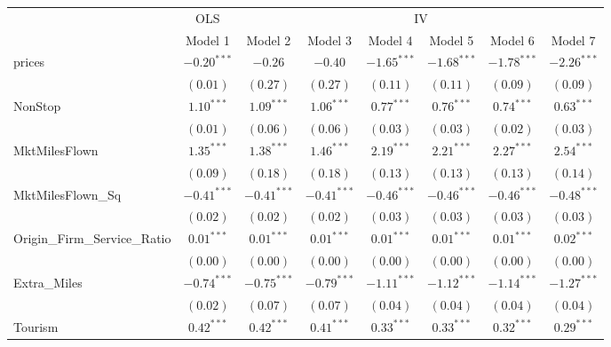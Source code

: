 
\begin{tabular}{l c c c c c c c}
\toprule
 & \multicolumn{1}{c}{OLS} & \multicolumn{6}{c}{IV} \\
\cmidrule(lr){2-2} \cmidrule(lr){3-8}
 & Model 1 & Model 2 & Model 3 & Model 4 & Model 5 & Model 6 & Model 7 \\
\midrule
prices                       & $-0.20^{***}$ & $-0.26$       & $-0.40$       & $-1.65^{***}$ & $-1.68^{***}$    & $-1.78^{***}$ & $-2.26^{***}$  \\
                             & $(0.01)$      & $(0.27)$      & $(0.27)$      & $(0.11)$      & $(0.11)$         & $(0.09)$      & $(0.09)$       \\
NonStop                      & $1.10^{***}$  & $1.09^{***}$  & $1.06^{***}$  & $0.77^{***}$  & $0.76^{***}$     & $0.74^{***}$  & $0.63^{***}$   \\
                             & $(0.01)$      & $(0.06)$      & $(0.06)$      & $(0.03)$      & $(0.03)$         & $(0.02)$      & $(0.03)$       \\
MktMilesFlown                & $1.35^{***}$  & $1.38^{***}$  & $1.46^{***}$  & $2.19^{***}$  & $2.21^{***}$     & $2.27^{***}$  & $2.54^{***}$   \\
                             & $(0.09)$      & $(0.18)$      & $(0.18)$      & $(0.13)$      & $(0.13)$         & $(0.13)$      & $(0.14)$       \\
MktMilesFlown\_Sq            & $-0.41^{***}$ & $-0.41^{***}$ & $-0.41^{***}$ & $-0.46^{***}$ & $-0.46^{***}$    & $-0.46^{***}$ & $-0.48^{***}$  \\
                             & $(0.02)$      & $(0.02)$      & $(0.02)$      & $(0.03)$      & $(0.03)$         & $(0.03)$      & $(0.03)$       \\
Origin\_Firm\_Service\_Ratio & $0.01^{***}$  & $0.01^{***}$  & $0.01^{***}$  & $0.01^{***}$  & $0.01^{***}$     & $0.01^{***}$  & $0.02^{***}$   \\
                             & $(0.00)$      & $(0.00)$      & $(0.00)$      & $(0.00)$      & $(0.00)$         & $(0.00)$      & $(0.00)$       \\
Extra\_Miles                 & $-0.74^{***}$ & $-0.75^{***}$ & $-0.79^{***}$ & $-1.11^{***}$ & $-1.12^{***}$    & $-1.14^{***}$ & $-1.27^{***}$  \\
                             & $(0.02)$      & $(0.07)$      & $(0.07)$      & $(0.04)$      & $(0.04)$         & $(0.04)$      & $(0.04)$       \\
Tourism                      & $0.42^{***}$  & $0.42^{***}$  & $0.41^{***}$  & $0.33^{***}$  & $0.33^{***}$     & $0.32^{***}$  & $0.29^{***}$   \\

\end{tabular}

